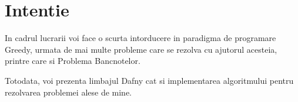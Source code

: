 \chapter*{Intentie} 

In cadrul lucrarii voi face o scurta intorducere in paradigma de programare Greedy, urmata de mai multe probleme care se rezolva cu ajutorul acesteia, printre care si Problema Bancnotelor.

Totodata, voi prezenta limbajul Dafny cat si implementarea algoritmului pentru rezolvarea problemei alese de mine. 